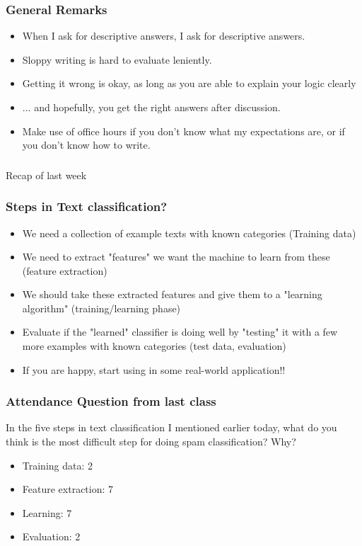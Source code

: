 \documentclass{beamer}
\begin{document}
\begin{frame}
\frametitle{General Remarks}
\begin{itemize}
\item When I ask for descriptive answers, I ask for descriptive answers.
\item Sloppy writing is hard to evaluate leniently. 
\item Getting it wrong is okay, as long as you are able to explain your logic clearly
\item ... and hopefully, you get the right answers after discussion.
\item Make use of office hours if you don't know what my expectations are, or if you don't know how to write.
\end{itemize}
\end{frame}

\begin{frame}
\frametitle{}
\begin{center}
\Large Recap of last week
\end{center}
\end{frame}

\begin{frame}
\frametitle{Steps in Text classification?}
\begin{itemize}
\item We need a collection of example texts with known categories (Training data)
\item We need to extract "features" we want the machine to learn from these (feature extraction)
\item We should take these extracted features and give them to a "learning algorithm" (training/learning phase)
\item Evaluate if the "learned" classifier is doing well by "testing" it with a few more examples with known categories (test data, evaluation)
\item If you are happy, start using in some real-world application!!
\end{itemize}
\end{frame}

\begin{frame}
\frametitle{Attendance Question from last class}
In the five steps in text classification I mentioned earlier today, what do you think is the most difficult step for doing spam classification? Why? \pause
\begin{itemize}
\item Training data:  2
\item Feature extraction: 7 
\item Learning: 7
\item Evaluation: 2
\end{itemize}
\end{frame}
\end{document}

